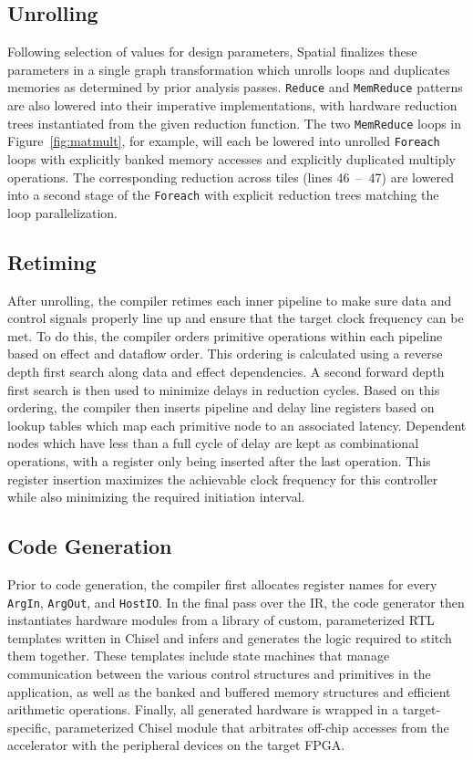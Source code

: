 


\subsection{Unrolling}
Following selection of values for design parameters, Spatial finalizes these parameters in a single graph transformation which unrolls loops and duplicates memories as determined by prior analysis passes.
\texttt{Reduce} and \texttt{MemReduce} patterns are also lowered into their imperative implementations, with hardware reduction trees instantiated from the given reduction function.
The two \texttt{MemReduce} loops in Figure~\ref{fig:matmult}, for example, will each be lowered into unrolled \texttt{Foreach} loops with explicitly banked memory accesses and explicitly duplicated multiply operations. The corresponding reduction across tiles (lines 46~--~47) are lowered into a second stage of the \texttt{Foreach} with explicit reduction trees matching the loop parallelization.

\subsection{Retiming}
After unrolling, the compiler retimes each inner pipeline to make sure data and control signals properly line up and ensure that the target clock frequency can be met.
To do this, the compiler orders primitive operations within each pipeline based on effect and dataflow order.
This ordering is calculated using a reverse depth first search along data and effect dependencies.
A second forward depth first search is then used to minimize delays in reduction cycles.
Based on this ordering, the compiler then inserts pipeline and delay line registers based on lookup tables which map each primitive node to an associated latency. Dependent nodes which have less than a full cycle of delay are kept as combinational operations, with a register only being inserted after the last operation.
This register insertion maximizes the achievable clock frequency for this controller while also minimizing the required initiation interval.

\subsection{Code Generation}
Prior to code generation, the compiler first allocates register names for every \texttt{\small{ArgIn}}, \texttt{\small{ArgOut}}, and \texttt{\small{HostIO}}.
In the final pass over the IR, the code generator then instantiates hardware modules from a library of custom, parameterized RTL templates written in Chisel and infers and generates the logic required to stitch them together.  These templates include state machines that manage communication between the various control structures and primitives in the application, as well as the banked and buffered memory structures and efficient arithmetic operations.  Finally, all generated hardware is wrapped in a target-specific, parameterized Chisel module that arbitrates off-chip accesses from the accelerator with the peripheral devices on the target FPGA.
